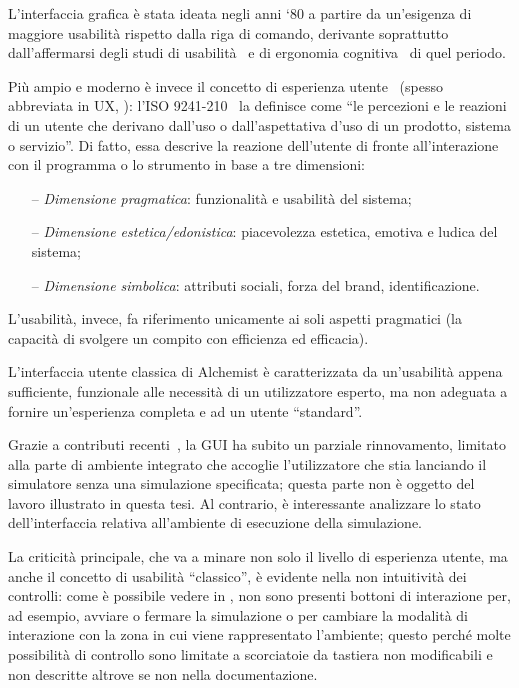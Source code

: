                 L'interfaccia grafica è stata ideata negli anni `80 a partire da un'esigenza di maggiore usabilità rispetto dalla riga di comando, derivante soprattutto dall'affermarsi degli studi di usabilità~\cite{norman1988} e di ergonomia cognitiva~\cite{cognitiveErgonomics} di quel periodo.

                Più ampio e moderno è invece il concetto di esperienza utente~\cite{ux} (spesso abbreviata in UX, ):
                l'ISO 9241-210~\cite{iso9241} la definisce come ``le percezioni e le reazioni di un utente che derivano dall'uso o dall'aspettativa d'uso di un prodotto, sistema o servizio''.
                Di fatto, essa descrive la reazione dell'utente di fronte all'interazione con il programma o lo strumento in base a tre dimensioni:
                \begin{itemize}
                    \item[--] \emph{Dimensione pragmatica}:
                        funzionalità e usabilità del sistema;
                    \item[--] \emph{Dimensione estetica/edonistica}:
                        piacevolezza estetica, emotiva e ludica del sistema;
                    \item[--] \emph{Dimensione simbolica}:
                        attributi sociali, forza del brand, identificazione.
                \end{itemize}
                L'usabilità, invece, fa riferimento unicamente ai soli aspetti pragmatici (la capacità di svolgere un compito con efficienza ed efficacia).

                L'interfaccia utente classica di Alchemist è caratterizzata da un'usabilità appena sufficiente, funzionale alle necessità di un utilizzatore esperto, ma non adeguata a fornire un'esperienza completa e  ad un utente ``standard''.

                Grazie a contributi recenti~\cite{casadio}, la GUI ha subito un parziale rinnovamento, limitato alla parte di ambiente integrato che accoglie l'utilizzatore che stia lanciando il simulatore senza una simulazione specificata;
                questa parte non è oggetto del lavoro illustrato in questa tesi.
                Al contrario, è interessante analizzare lo stato dell'interfaccia relativa all'ambiente di esecuzione della simulazione.

                La criticità principale, che va a minare non solo il livello di esperienza utente, ma anche il concetto di usabilità  ``classico'', è evidente nella non intuitività dei controlli:
                come è possibile vedere in , non sono presenti bottoni di interazione per, ad esempio, avviare o fermare la simulazione o per cambiare la modalità di interazione con la zona in cui viene rappresentato l'ambiente;
                questo perché molte possibilità di controllo sono limitate a scorciatoie da tastiera non modificabili e non descritte altrove se non nella documentazione.

